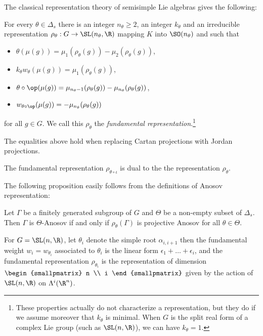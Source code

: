 The classical representation theory of semisimple Lie algebras gives the following:
\begin{lemma}
For every $\theta \in \Delta_s$ there is an integer $n_\theta \geq 2$, an integer $k_\theta$ and an irreducible representation $\rho_\theta: G\to \SL(n_\theta,\R)$ mapping $K$ into $\SO(n_\theta)$ and such that
\begin{itemize}
\item $\theta(\mu(g))= \mu_1(\rho_\theta(g)) - \mu_2(\rho_\theta(g))$,
\item $k_\theta w_\theta(\mu(g)) = \mu_1(\rho_\theta(g))$,
\item $\theta\circ \op(\mu(g))= \mu_{n_\theta-1}(\rho_\theta(g)) - \mu_{n_\theta}(\rho_\theta(g))$,
\item $w_{\theta\circ \op}(\mu(g)) = -\mu_{n_\theta}(\rho_\theta(g))$
\end{itemize}
for all $g\in G$. We call this $\rho_\theta$ the \emph{fundamental representation}.\footnote{These properties actually do not characterize a representation, but they do if we assume moreover that $k_\theta$ is minimal. When $G$ is the split real form of a complex Lie group (such as $\SL(n,\R)$), we can have $k_\theta= 1$.}
\end{lemma}

\begin{rmk}
The equalities above hold when replacing Cartan projections with Jordan projections.
\end{rmk}

\begin{rmk}
The fundamental representation $\rho_{\theta\circ \iota}$ is dual to the the representation $\rho_\theta$.
\end{rmk}

The following proposition easily follows from the definitions of Anosov representation:

\begin{prop}
Let $\Gamma$ be a finitely generated subgroup of $G$ and $\Theta$ be a non-empty subset of $\Delta_s$. Then $\Gamma$ is $\Theta$-Anosov if and only if $\rho_\theta(\Gamma)$ is projective Anosov for all $\theta \in \Theta$.
\end{prop}

\begin{example}
For $G= \SL(n,\R)$, let $\theta_i$ denote the simple root $\alpha_{i,i+1}$ then the fundamental weight $w_i = w_{\theta_i}$ associated to $\theta_i$ is the linear form $\epsilon_1+\ldots + \epsilon_i$, and the fundamental representation $\rho_{\theta_i}$ is the representation of dimension $\begin{smallpmatrix} n \\ i \end{smallpmatrix}$ given by the action of $\SL(n,\R)$ on $\Lambda^i(\R^n)$.
\end{example}

